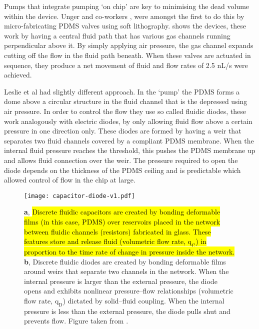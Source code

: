 Pumps that integrate pumping ‘on chip’ are key to minimising the dead volume within the device.
Unger and co-workers \citep{RN59}, were amongst the first to do this by micro-fabricating PDMS valves
using soft lithography.  shows the devices, these work by having a central fluid path that has various gas
channels running perpendicular above it. By simply applying air pressure, the gas channel expands cutting off
the flow in the fluid path beneath. When these valves are actuated in sequence, they produce a
net movement of fluid and flow rates of 2.5 nL/s were achieved.

Leslie et al \citep{RN100} had slightly different
approach. In the ‘pump’ the PDMS forms
a dome above a circular structure in the fluid channel that is the depressed using air
pressure. In order to control the flow they use so called fluidic diodes, these work
analogously with electric diodes, by only allowing fluid flow above a certain pressure in
one direction only. These diodes are formed by having a weir that separates two fluid
channels covered by a compliant PDMS membrane. When the internal fluid pressure reaches the
threshold, this pushes the PDMS membrane up and allows fluid connection over the weir. The
pressure required to open the diode depends on the thickness of the PDMS ceiling and is
predictable which allowed control of flow in the chip at large.

\begin{figure}
\begin{center}
  \texttt{[image: capacitor-diode-v1.pdf]}
\end{center}
  \caption{\textbf{a}, \hl{Discrete fluidic capacitors are created by bonding deformable films (in
   this case, PDMS) over reservoirs placed in the network between fluidic channels (resistors)
    fabricated in glass. These features store and release fluid (volumetric flow rate, $\text{q}_{\text{C}}$) in
    proportion to the time rate of change in pressure inside the network.} \textbf{b}, Discrete fluidic diodes are created by bonding deformable films around
    weirs that separate two channels in the network. When the internal pressure is larger than
    the external pressure, the diode opens and exhibits nonlinear pressure–flow relationships
    (volumetric flow rate, $\text{q}_{\text{D}}$) dictated by solid–fluid coupling. When the internal pressure is
    less than the external pressure, the diode pulls shut and prevents flow. Figure taken from
    \citep{RN100}.}
  \label{fig:Leslie-valves}
\end{figure}

